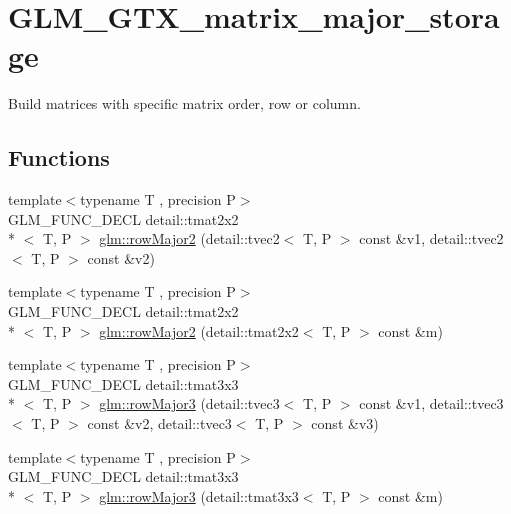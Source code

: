 \hypertarget{group__gtx__matrix__major__storage}{\section{G\-L\-M\-\_\-\-G\-T\-X\-\_\-matrix\-\_\-major\-\_\-storage}
\label{group__gtx__matrix__major__storage}
}


Build matrices with specific matrix order, row or column.  


\subsection*{Functions}
\begin{DoxyCompactItemize}
\item 
{\footnotesize template$<$typename T , precision P$>$ }\\G\-L\-M\-\_\-\-F\-U\-N\-C\-\_\-\-D\-E\-C\-L detail\-::tmat2x2\\*
$<$ T, P $>$ \hyperlink{group__gtx__matrix__major__storage_ga63d72819ad07f4f875a0565f1462652b}{glm\-::row\-Major2} (detail\-::tvec2$<$ T, P $>$ const \&v1, detail\-::tvec2$<$ T, P $>$ const \&v2)
\item 
{\footnotesize template$<$typename T , precision P$>$ }\\G\-L\-M\-\_\-\-F\-U\-N\-C\-\_\-\-D\-E\-C\-L detail\-::tmat2x2\\*
$<$ T, P $>$ \hyperlink{group__gtx__matrix__major__storage_ga5e3cee7cdc09b9ebf0e072247a5eac54}{glm\-::row\-Major2} (detail\-::tmat2x2$<$ T, P $>$ const \&m)
\item 
{\footnotesize template$<$typename T , precision P$>$ }\\G\-L\-M\-\_\-\-F\-U\-N\-C\-\_\-\-D\-E\-C\-L detail\-::tmat3x3\\*
$<$ T, P $>$ \hyperlink{group__gtx__matrix__major__storage_gaacbbf46215dff1c3da9599916ba04a94}{glm\-::row\-Major3} (detail\-::tvec3$<$ T, P $>$ const \&v1, detail\-::tvec3$<$ T, P $>$ const \&v2, detail\-::tvec3$<$ T, P $>$ const \&v3)
\item 
{\footnotesize template$<$typename T , precision P$>$ }\\G\-L\-M\-\_\-\-F\-U\-N\-C\-\_\-\-D\-E\-C\-L detail\-::tmat3x3\\*
$<$ T, P $>$ \hyperlink{group__gtx__matrix__major__storage_gafb5e7381b2451a85db394c457c284fb7}{glm\-::row\-Major3} (detail\-::tmat3x3$<$ T, P $>$ const \&m)
\item 

\end{DoxyCompactItemize}
